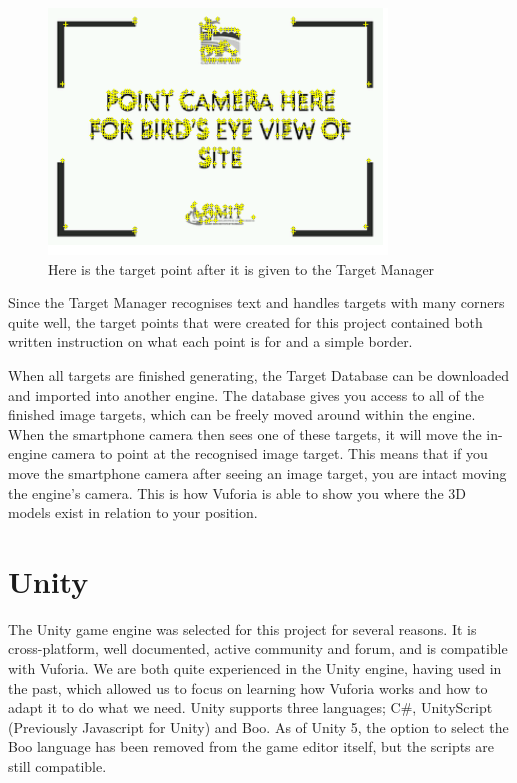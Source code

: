 \clearpage
\begin{figure}[ht!]
	\centering
	\includegraphics[width=90mm]{points}
	\caption{Here is the target point after it is given to the Target Manager \label{overflow}}
\end{figure}


Since the Target Manager recognises text and handles targets with many corners quite well, the target points that were created for this project contained both written instruction on what each point is for and a simple border. 

When all targets are finished generating, the Target Database can be downloaded and imported into another engine. The database gives you access to all of the finished image targets, which can be freely moved around within the engine. When the smartphone camera then sees one of these targets, it will move the in-engine camera to point at the recognised image target. This means that if you move the smartphone camera after seeing an image target, you are intact moving the engine’s camera. This is how Vuforia is able to show you where the 3D models exist in relation to your position.


\section{Unity}
The Unity game engine was selected for this project for several reasons. It is cross-platform, well documented, active community and forum, and is compatible with Vuforia. We are both quite experienced in the Unity engine, having used in the past, which allowed us to focus on learning how Vuforia works and how to adapt it to do what we need. Unity supports three languages; C\#, UnityScript (Previously Javascript for Unity) and Boo. As of Unity 5, the option to select the Boo language has been removed from the game editor itself, but the scripts are still compatible. 

